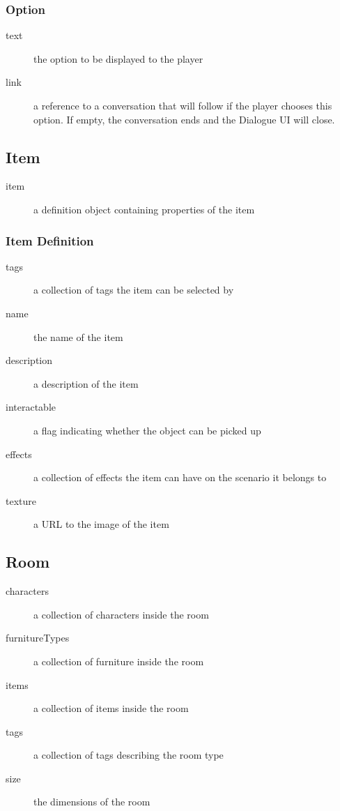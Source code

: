 \subsubsection{Option}
\begin{description}
\item[text]{the option to be displayed to the player}
\item[link]{a reference to a conversation that will follow if the player chooses this option. If empty, the conversation ends and the Dialogue UI will close.}
\end{description}

\subsection{Item}
\begin{description}
\item[item]{a definition object containing properties of the item}
\end{description}

\subsubsection{Item Definition}
\begin{description}
\item[tags]{a collection of tags the item can be selected by}
\item[name]{the name of the item}
\item[description]{a description of the item}
\item[interactable]{a flag indicating whether the object can be picked up}
\item[effects]{a collection of effects the item can have on the scenario it belongs to}
\item[texture]{a URL to the image of the item}
\end{description}

\subsection{Room}
\begin{description}
\item[characters]{a collection of characters inside the room}
\item[furnitureTypes]{a collection of furniture inside the room}
\item[items]{a collection of items inside the room}
\item[tags]{a collection of tags describing the room type}
\item[size]{the dimensions of the room}
\end{description}

